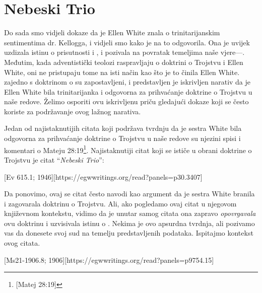 \chapter{Nebeski Trio}

Do sada smo vidjeli dokaze da je Ellen White znala o trinitarijanskim sentimentima dr. Kellogga, i vidjeli smo kako je na to odgovorila. Ona je uvijek uzdizala istinu o prisutnosti i , i pozivala na povratak temeljima naše vjere—. Međutim, kada adventistički teolozi raspravljaju o doktrini o Trojstvu i Ellen White, oni ne pristupaju tome na isti način kao što je to činila Ellen White.  zajedno s doktrinom o  su zapostavljeni, i predstavljen je iskrivljen narativ da je Ellen White bila trinitarijanka i odgovorna za prihvaćanje doktrine o Trojstvu u naše redove. Želimo osporiti ovu iskrivljenu priču gledajući dokaze koji se često koriste za podržavanje ovog lažnog narativa.

Jedan od najistaknutijih citata koji podržava tvrdnju da je sestra White bila odgovorna za prihvaćanje doktrine o Trojstvu u naše redove su njezini spisi i komentari o Mateju 28:19\footnote{[Matej 28:19]}. Najistaknutiji citat koji se ističe u obrani doktrine o Trojstvu je citat “\textit{Nebeski Trio}”:

[Ev 615.1; 1946][https://egwwritings.org/read?panels=p30.3407]

Da ponovimo, ovaj se citat često navodi kao argument da je sestra White branila i zagovarala doktrinu o Trojstvu. Ali, ako pogledamo ovaj citat u njegovom književnom kontekstu, vidimo da je unutar samog citata ona zapravo \textit{opovrgavala} ovu doktrinu i uzvisivala istinu o . Nekima je ovo apsurdna tvrdnja, ali pozivamo vas da donesete svoj sud na temelju predstavljenih podataka. Ispitajmo kontekst ovog citata.

[Ms21-1906.8; 1906][https://egwwritings.org/read?panels=p9754.15]

